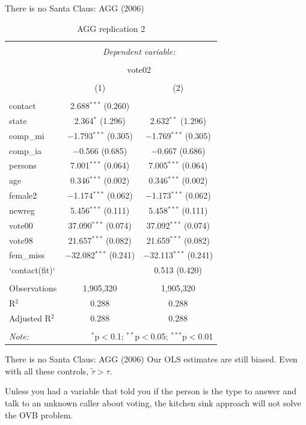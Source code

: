 \documentclass[
  ignorenonframetext,
]{beamer}
\begin{document}
\begin{frame}[fragile]{There is no Santa Claus: AGG (2006)}
\begin{table}[!htbp] \centering 
  \caption{AGG replication 2} 
  \label{} 
\begin{tabular}{@{\extracolsep{5pt}}lcc} 
\\[-1.8ex]\hline 
\hline \\[-1.8ex] 
 & \multicolumn{2}{c}{\textit{Dependent variable:}} \\ 
\cline{2-3} 
\\[-1.8ex] & \multicolumn{2}{c}{vote02} \\ 
\\[-1.8ex] & (1) & (2)\\ 
\hline \\[-1.8ex] 
 contact & 2.688$^{***}$ (0.260) &  \\ 
  state & 2.364$^{*}$ (1.296) & 2.632$^{**}$ (1.296) \\ 
  comp\_mi & $-$1.793$^{***}$ (0.305) & $-$1.769$^{***}$ (0.305) \\ 
  comp\_ia & $-$0.566 (0.685) & $-$0.667 (0.686) \\ 
  persons & 7.001$^{***}$ (0.064) & 7.005$^{***}$ (0.064) \\ 
  age & 0.346$^{***}$ (0.002) & 0.346$^{***}$ (0.002) \\ 
  female2 & $-$1.174$^{***}$ (0.062) & $-$1.173$^{***}$ (0.062) \\ 
  newreg & 5.456$^{***}$ (0.111) & 5.458$^{***}$ (0.111) \\ 
  vote00 & 37.090$^{***}$ (0.074) & 37.092$^{***}$ (0.074) \\ 
  vote98 & 21.657$^{***}$ (0.082) & 21.659$^{***}$ (0.082) \\ 
  fem\_miss & $-$32.082$^{***}$ (0.241) & $-$32.113$^{***}$ (0.241) \\ 
  `contact(fit)` &  & 0.513 (0.420) \\ 
 \hline \\[-1.8ex] 
Observations & 1,905,320 & 1,905,320 \\ 
R$^{2}$ & 0.288 & 0.288 \\ 
Adjusted R$^{2}$ & 0.288 & 0.288 \\ 
\hline 
\hline \\[-1.8ex] 
\textit{Note:}  & \multicolumn{2}{r}{$^{*}$p$<$0.1; $^{**}$p$<$0.05; $^{***}$p$<$0.01} \\ 
\end{tabular} 
\end{table}
\end{frame}

\begin{frame}{There is no Santa Claus: AGG (2006)}
\protect\hypertarget{there-is-no-santa-claus-agg-2006-7}{}
Our OLS estimates are still biased. Even with all these controls,
\(\tilde{\tau}>\tau\).

Unless you had a variable that told you if the person is the type to
answer and talk to an unknown caller about voting, the kitchen sink
approach will not solve the OVB problem.
\end{frame}
\end{document}

